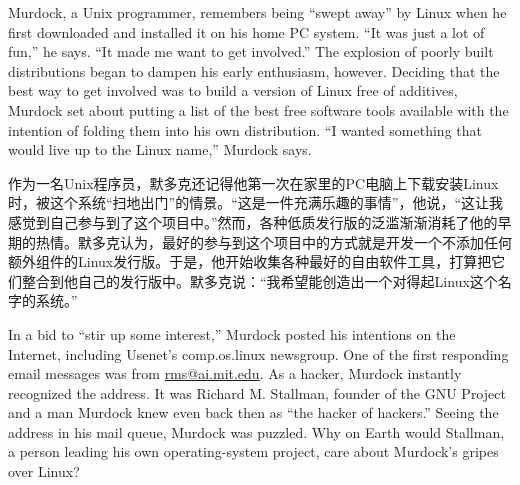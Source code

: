 \ifdefined\eng
Murdock, a Unix programmer, remembers being ``swept away'' by Linux when he first downloaded and installed it on his home PC system. ``It was just a lot of fun,'' he says. ``It made me want to get involved.'' The explosion of poorly built distributions began to dampen his early enthusiasm, however. Deciding that the best way to get involved was to build a version of Linux free of additives, Murdock set about putting a list of the best free software tools available with the intention of folding them into his own distribution. ``I wanted something that would live up to the Linux name,'' Murdock says.
\fi

\ifdefined\chs
作为一名Unix程序员，默多克还记得他第一次在家里的PC电脑上下载安装Linux时，被这个系统``扫地出门''的情景。``这是一件充满乐趣的事情''，他说，``这让我感觉到自己参与到了这个项目中。''然而，各种低质发行版的泛滥渐渐消耗了他的早期的热情。默多克认为，最好的参与到这个项目中的方式就是开发一个不添加任何额外组件的Linux发行版。于是，他开始收集各种最好的自由软件工具，打算把它们整合到他自己的发行版中。默多克说：``我希望能创造出一个对得起Linux这个名字的系统。''
\fi

\ifdefined\eng
In a bid to ``stir up some interest,'' Murdock posted his intentions on the Internet, including Usenet's comp.os.linux newsgroup. One of the first responding email messages was from \url{rms@ai.mit.edu}. As a hacker, Murdock instantly recognized the address. It was Richard M. Stallman, founder of the GNU Project and a man Murdock knew even back then as ``the hacker of hackers.'' Seeing the address in his mail queue, Murdock was puzzled. Why on Earth would Stallman, a person leading his own operating-system project, care about Murdock's gripes over Linux?
\fi

